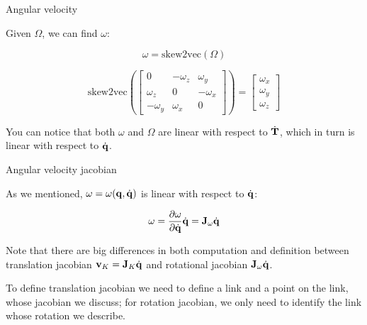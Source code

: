 \documentclass{beamer}
\begin{document}
\begin{frame}{Angular velocity}
	\begin{flushleft}
		
		
		Given $\Omega$, we can find $\omega$:
		
		\begin{equation}
			\omega =\text{skew2vec}(\Omega)
		\end{equation}		
	
		\begin{equation}
			\text{skew2vec} \left(
			\begin{bmatrix}
				0 & -\omega_z & \omega_y \\
				\omega_z & 0 & -\omega_x \\
				-\omega_y & \omega_x & 0
			\end{bmatrix} 
		\right)
		=
		\begin{bmatrix}
			\omega_x \\ \omega_y \\ \omega_z
		\end{bmatrix} 
		\end{equation}		
	
	\bigskip
		
		You can notice that both $\omega$ and $\Omega$ are linear with respect to $\dot{ \mathbf{T} }$, which in turn is linear with respect to $\dot{\mathbf{q}}$.
		
	\end{flushleft}
\end{frame}



\begin{frame}{Angular velocity jacobian}
	\begin{flushleft}
		
		As we mentioned, $\omega = \omega(\mathbf{q}, \dot{\mathbf{q}})$ is linear with respect to $\dot{\mathbf{q}}$:
		
		\begin{equation}
			\omega = \frac{\partial \omega}{\partial \dot{\mathbf{q}}} \dot{\mathbf{q}}
			=
			\mathbf{J}_\omega \dot{\mathbf{q}}
		\end{equation}
	
	\bigskip
	
	Note that there are big differences in both computation and definition between translation jacobian $\mathbf{v}_K = 
	\mathbf{J}_K \dot{ \mathbf{q} }$ and rotational jacobian $\mathbf{J}_\omega \dot{\mathbf{q}}$. 
	
	
	\bigskip
	
	To define translation jacobian we need to define a link and a point on the link, whose jacobian we discuss; for rotation jacobian, we only need to identify the link whose rotation we describe.
		
		
	\end{flushleft}
\end{frame}
\end{document}
